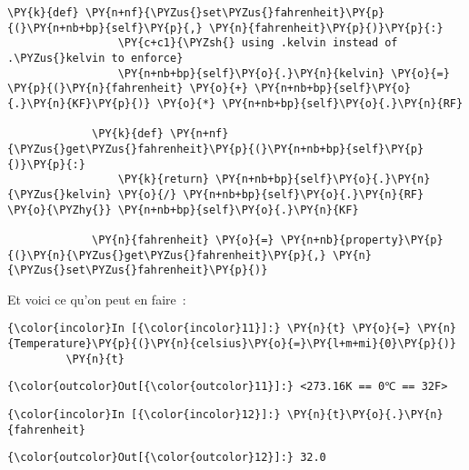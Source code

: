 \begin{Verbatim}[commandchars=\\\{\},frame=single,framerule=0.3mm,rulecolor=\color{cellframecolor}]
             \PY{k}{def} \PY{n+nf}{\PYZus{}set\PYZus{}fahrenheit}\PY{p}{(}\PY{n+nb+bp}{self}\PY{p}{,} \PY{n}{fahrenheit}\PY{p}{)}\PY{p}{:}
                 \PY{c+c1}{\PYZsh{} using .kelvin instead of .\PYZus{}kelvin to enforce}
                 \PY{n+nb+bp}{self}\PY{o}{.}\PY{n}{kelvin} \PY{o}{=} \PY{p}{(}\PY{n}{fahrenheit} \PY{o}{+} \PY{n+nb+bp}{self}\PY{o}{.}\PY{n}{KF}\PY{p}{)} \PY{o}{*} \PY{n+nb+bp}{self}\PY{o}{.}\PY{n}{RF}
         
             \PY{k}{def} \PY{n+nf}{\PYZus{}get\PYZus{}fahrenheit}\PY{p}{(}\PY{n+nb+bp}{self}\PY{p}{)}\PY{p}{:}
                 \PY{k}{return} \PY{n+nb+bp}{self}\PY{o}{.}\PY{n}{\PYZus{}kelvin} \PY{o}{/} \PY{n+nb+bp}{self}\PY{o}{.}\PY{n}{RF} \PY{o}{\PYZhy{}} \PY{n+nb+bp}{self}\PY{o}{.}\PY{n}{KF}
             
             \PY{n}{fahrenheit} \PY{o}{=} \PY{n+nb}{property}\PY{p}{(}\PY{n}{\PYZus{}get\PYZus{}fahrenheit}\PY{p}{,} \PY{n}{\PYZus{}set\PYZus{}fahrenheit}\PY{p}{)}
\end{Verbatim}


    Et voici ce qu'on peut en faire~:

    \begin{Verbatim}[commandchars=\\\{\},frame=single,framerule=0.3mm,rulecolor=\color{cellframecolor}]
{\color{incolor}In [{\color{incolor}11}]:} \PY{n}{t} \PY{o}{=} \PY{n}{Temperature}\PY{p}{(}\PY{n}{celsius}\PY{o}{=}\PY{l+m+mi}{0}\PY{p}{)}
         \PY{n}{t}
\end{Verbatim}


\begin{Verbatim}[commandchars=\\\{\},frame=single,framerule=0.3mm,rulecolor=\color{cellframecolor}]
{\color{outcolor}Out[{\color{outcolor}11}]:} <273.16K == 0℃ == 32F>
\end{Verbatim}
            
    \begin{Verbatim}[commandchars=\\\{\},frame=single,framerule=0.3mm,rulecolor=\color{cellframecolor}]
{\color{incolor}In [{\color{incolor}12}]:} \PY{n}{t}\PY{o}{.}\PY{n}{fahrenheit}
\end{Verbatim}


\begin{Verbatim}[commandchars=\\\{\},frame=single,framerule=0.3mm,rulecolor=\color{cellframecolor}]
{\color{outcolor}Out[{\color{outcolor}12}]:} 32.0
\end{Verbatim}
            
